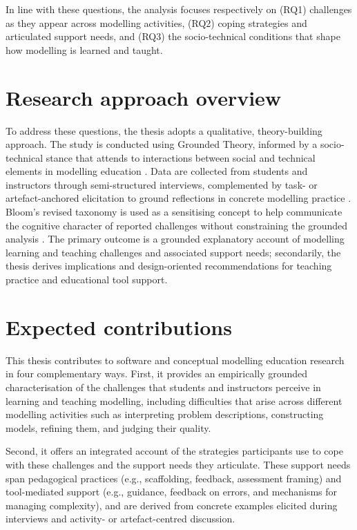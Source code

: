 In line with these questions, the analysis focuses respectively on (RQ1) challenges as they appear across modelling activities, (RQ2) coping strategies and articulated support needs, and (RQ3) the socio-technical conditions that shape how modelling is learned and taught.

\section{Research approach overview}
\label{sec:intro_approach}

To address these questions, the thesis adopts a qualitative, theory-building approach. The study is conducted using Grounded Theory, informed by a socio-technical stance that attends to interactions between social and technical elements in modelling education \cite{hoda2018socio,stol2016grounded}. Data are collected from students and instructors through semi-structured interviews, complemented by task- or artefact-anchored elicitation to ground reflections in concrete modelling practice \cite{istar-learning}. Bloom's revised taxonomy is used as a sensitising concept to help communicate the cognitive character of reported challenges without constraining the grounded analysis \cite{krathwohl2002revision,stol2016grounded}. The primary outcome is a grounded explanatory account of modelling learning and teaching challenges and associated support needs; secondarily, the thesis derives implications and design-oriented recommendations for teaching practice and educational tool support.

\section{Expected contributions}
\label{sec:intro_contributions}

This thesis contributes to software and conceptual modelling education research in four complementary ways. First, it provides an empirically grounded characterisation of the challenges that students and instructors perceive in learning and teaching modelling, including difficulties that arise across different modelling activities such as interpreting problem descriptions, constructing models, refining them, and judging their quality.

Second, it offers an integrated account of the strategies participants use to cope with these challenges and the support needs they articulate. These support needs span pedagogical practices (e.g., scaffolding, feedback, assessment framing) and tool-mediated support (e.g., guidance, feedback on errors, and mechanisms for managing complexity), and are derived from concrete examples elicited during interviews and activity- or artefact-centred discussion.

